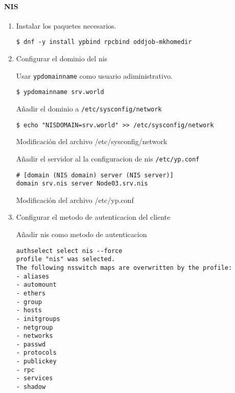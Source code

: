\documentclass[../main.tex]{subfiles}
\begin{document}
\paragraph{NIS}
\begin{enumerate}
  \item Instalar los paquetes necesarios.
        \begin{listing}
\begin{verbatim}
$ dnf -y install ypbind rpcbind oddjob-mkhomedir
\end{verbatim}
        \end{listing}

  \item Configurar el dominio del \acrshort{nis}

        Usar \texttt{ypdomainname} como usuario adiministrativo.
        \begin{listing}[H]
\begin{verbatim}
$ ypdomainname srv.world
\end{verbatim}
        \end{listing}
        Añadir el dominio a \texttt{/etc/sysconfig/network}
        \begin{listing}[H]
\begin{verbatim}
$ echo "NISDOMAIN=srv.world" >> /etc/sysconfig/network
\end{verbatim}
          \label{list:sysnetwork}
          \caption{Modificación del archivo /etc/sysconfig/network}
        \end{listing}
        Añadir el servidor al la configuracion de \acrshort{nis} \texttt{/etc/yp.conf}
        \begin{listing}[H]
\begin{verbatim}
# [domain (NIS domain) server (NIS server)]
domain srv.nis server Node03.srv.nis
\end{verbatim}
          \label{list:yp}
          \caption{Modificación del archivo /etc/yp.conf}
        \end{listing}

  \item Configurar el metodo de autenticacion del cliente

        Añadir \acrshort{nis} como metodo de autenticacion

        \begin{listing}[H]
\begin{verbatim}
authselect select nis --force
profile "nis" was selected.
The following nsswitch maps are overwritten by the profile:
- aliases
- automount
- ethers
- group
- hosts
- initgroups
- netgroup
- networks
- passwd
- protocols
- publickey
- rpc
- services
- shadow


\end{verbatim}
\end{listing}
\end{enumerate}
\end{document}
